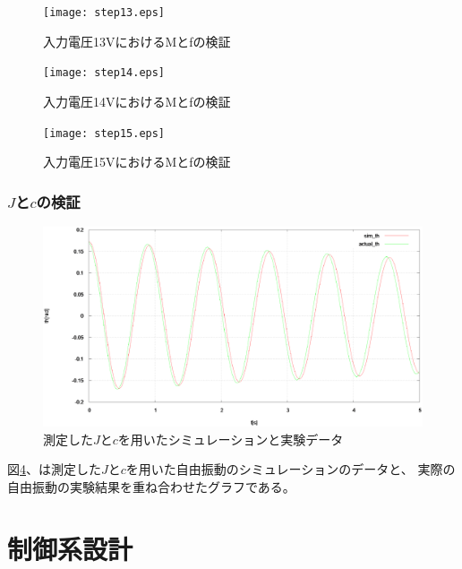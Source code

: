\documentclass[a4j,11pt,twoside]{ujbook}
\begin{document}
	\begin{figure}[htbp]
		\begin{center}
			\texttt{[image: step13.eps]}
			\caption{入力電圧13VにおけるMとfの検証}
			\label{fig:step13}
		\end{center}
	\end{figure}
	
	\begin{figure}[htbp]
		\begin{center}
			\texttt{[image: step14.eps]}
			\caption{入力電圧14VにおけるMとfの検証}
			\label{fig:step14}
		\end{center}
	\end{figure}
	
	\begin{figure}[htbp]
		\begin{center}
			\texttt{[image: step15.eps]}
			\caption{入力電圧15VにおけるMとfの検証}
			\label{fig:step15}
		\end{center}
	\end{figure}
	
	
	\subsection{$J$と$c$の検証}
	\begin{figure}[htbp]
		\begin{center}
			\includegraphics[width = 1.0 \linewidth]{freePendulum.eps}
			\caption{測定した$J$と$c$を用いたシミュレーションと実験データ}
			\label{fig:Jc}
		\end{center}
	\end{figure}
	図\ref{fig:Jc}、は測定した$J$と$c$を用いた自由振動のシミュレーションのデータと、
	実際の自由振動の実験結果を重ね合わせたグラフである。


\chapter{制御系設計}
\end{document}
